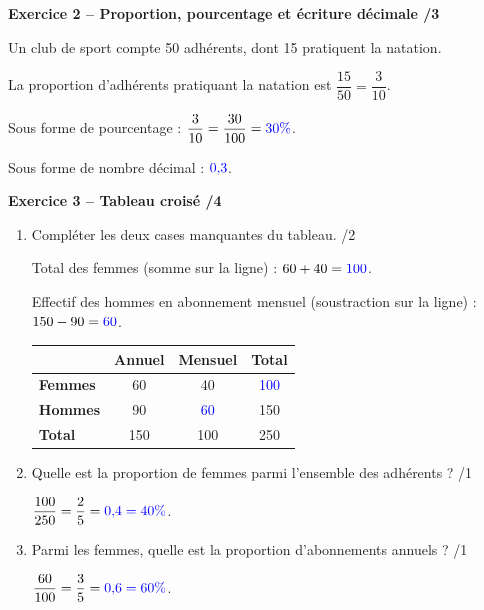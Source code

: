 \documentclass[10pt,a4paper]{article}
\begin{document}
\textbf{Exercice 2 -- Proportion, pourcentage et écriture décimale \hfill /3}

Un club de sport compte 50 adhérents, dont 15 pratiquent la natation.

La proportion d'adhérents pratiquant la natation est \(\dfrac{15}{50}=\dfrac{3}{10}\).

Sous forme de pourcentage : \(\dfrac{3}{10}=\dfrac{30}{100}=\textcolor{blue}{30\%}\).

Sous forme de nombre décimal : \(\textcolor{blue}{0{,}3}\).

\textbf{Exercice 3 -- Tableau croisé \hfill /4}

\begin{enumerate}
\item Compléter les deux cases manquantes du tableau. \hfill /2

Total des femmes (somme sur la ligne) : \(60+40=\textcolor{blue}{100}\).

Effectif des hommes en abonnement mensuel (soustraction sur la ligne) : \(150-90=\textcolor{blue}{60}\).

\begin{center}
\renewcommand{\arraystretch}{1.5}
\begin{tabular}{|l|c|c|c|}
\hline
 & \textbf{Annuel} & \textbf{Mensuel} & \textbf{Total} \\
\hline
\textbf{Femmes} & 60 & 40 & \textcolor{blue}{100} \\
\hline
\textbf{Hommes} & 90 & \textcolor{blue}{60} & 150 \\
\hline
\textbf{Total} & 150 & 100 & 250 \\
\hline
\end{tabular}
\end{center}

\item Quelle est la proportion de femmes parmi l'ensemble des adhérents ? \hfill /1

\(\dfrac{100}{250}=\dfrac{2}{5}=\textcolor{blue}{0{,}4=40\%}\).

\item Parmi les femmes, quelle est la proportion d'abonnements annuels ? \hfill /1

\(\dfrac{60}{100}=\dfrac{3}{5}=\textcolor{blue}{0{,}6=60\%}\).
\end{enumerate}

\newpage

\end{document}
